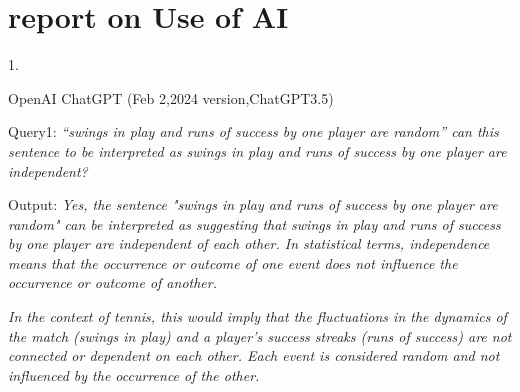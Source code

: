 \section{report on Use of AI}

\cite{Alice13}

1.

OpenAI ChatGPT (Feb 2,2024 version,ChatGPT3.5)

Query1:  \emph{
    “swings in play and runs of success by one player are random” 
can this sentence to be interpreted as  swings in play and runs of success by one player are independent?
}

Output: \emph{Yes, the sentence "swings in play and runs of success by one player are random" 
can be interpreted as suggesting that swings in play and runs of success by one player are 
independent of each other. In statistical terms, independence means that the occurrence or 
outcome of one event does not influence the occurrence or outcome of another.}

\emph{
In the context of tennis, this would imply that the fluctuations in the dynamics of the match 
(swings in play) and a player's success streaks (runs of success) are not connected or dependent 
on each other. Each event is considered random and not influenced by the occurrence of the other.
}
